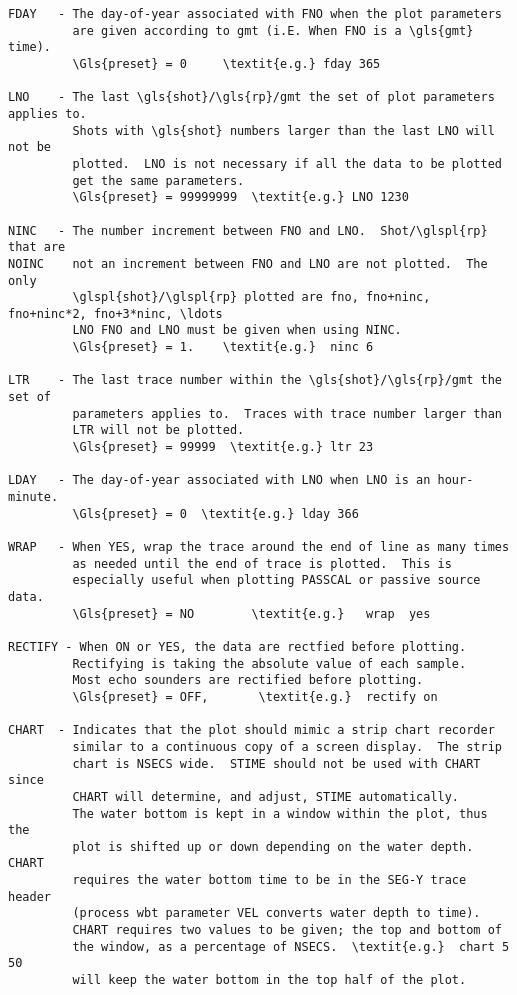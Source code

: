 \begin{verbatim}
FDAY   - The day-of-year associated with FNO when the plot parameters
         are given according to gmt (i.E. When FNO is a \gls{gmt} time).
         \Gls{preset} = 0     \textit{e.g.} fday 365

LNO    - The last \gls{shot}/\gls{rp}/gmt the set of plot parameters applies to.
         Shots with \gls{shot} numbers larger than the last LNO will not be
         plotted.  LNO is not necessary if all the data to be plotted
         get the same parameters.
         \Gls{preset} = 99999999  \textit{e.g.} LNO 1230

NINC   - The number increment between FNO and LNO.  Shot/\glspl{rp} that are
NOINC    not an increment between FNO and LNO are not plotted.  The only
         \glspl{shot}/\glspl{rp} plotted are fno, fno+ninc, fno+ninc*2, fno+3*ninc, \ldots
         LNO FNO and LNO must be given when using NINC.
         \Gls{preset} = 1.    \textit{e.g.}  ninc 6

LTR    - The last trace number within the \gls{shot}/\gls{rp}/gmt the set of
         parameters applies to.  Traces with trace number larger than
         LTR will not be plotted.
         \Gls{preset} = 99999  \textit{e.g.} ltr 23

LDAY   - The day-of-year associated with LNO when LNO is an hour-minute.
         \Gls{preset} = 0  \textit{e.g.} lday 366

WRAP   - When YES, wrap the trace around the end of line as many times
         as needed until the end of trace is plotted.  This is
         especially useful when plotting PASSCAL or passive source data.
         \Gls{preset} = NO        \textit{e.g.}   wrap  yes

RECTIFY - When ON or YES, the data are rectfied before plotting.
         Rectifying is taking the absolute value of each sample.
         Most echo sounders are rectified before plotting.
         \Gls{preset} = OFF,       \textit{e.g.}  rectify on

CHART  - Indicates that the plot should mimic a strip chart recorder
         similar to a continuous copy of a screen display.  The strip
         chart is NSECS wide.  STIME should not be used with CHART since
         CHART will determine, and adjust, STIME automatically.
         The water bottom is kept in a window within the plot, thus the
         plot is shifted up or down depending on the water depth.  CHART
         requires the water bottom time to be in the SEG-Y trace header
         (process wbt parameter VEL converts water depth to time).
         CHART requires two values to be given; the top and bottom of
         the window, as a percentage of NSECS.  \textit{e.g.}  chart 5 50
         will keep the water bottom in the top half of the plot.


\end{verbatim}
